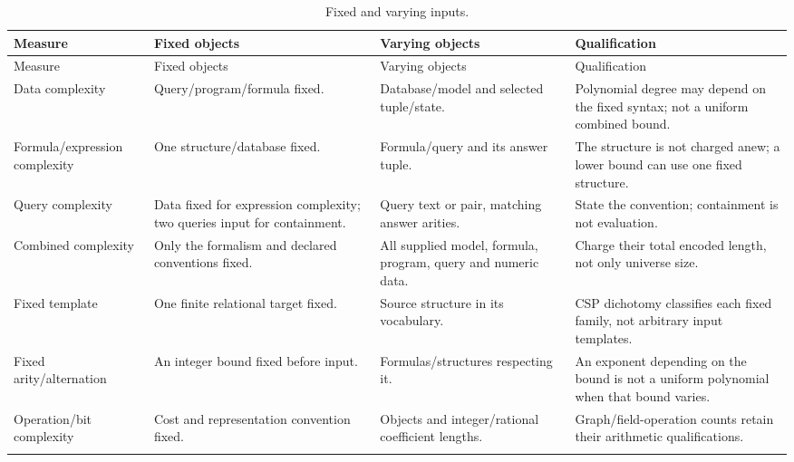 \begin{landscape}
\begingroup\small\setlength{\tabcolsep}{3pt}
\begin{longtable}{@{}p{.18\linewidth}p{.25\linewidth}p{.23\linewidth}p{.26\linewidth}@{}}
\caption{Fixed and varying inputs.}\label{tab:p14-dc-measures}\\
\toprule
Measure & Fixed objects & Varying objects & Qualification\\\midrule
\endfirsthead
\toprule
Measure & Fixed objects & Varying objects & Qualification\\\midrule
\endhead
\bottomrule\endfoot
Data complexity & Query/program/formula fixed. & Database/model and selected tuple/state. & Polynomial degree may depend on the fixed syntax; not a uniform combined bound.\\\addlinespace
Formula/expression complexity & One structure/database fixed. & Formula/query and its answer tuple. & The structure is not charged anew; a lower bound can use one fixed structure.\\\addlinespace
Query complexity & Data fixed for expression complexity; two queries input for containment. & Query text or pair, matching answer arities. & State the convention; containment is not evaluation.\\\addlinespace
Combined complexity & Only the formalism and declared conventions fixed. & All supplied model, formula, program, query and numeric data. & Charge their total encoded length, not only universe size.\\\addlinespace
Fixed template & One finite relational target fixed. & Source structure in its vocabulary. & CSP dichotomy classifies each fixed family, not arbitrary input templates.\\\addlinespace
Fixed arity/alternation & An integer bound fixed before input. & Formulas/structures respecting it. & An exponent depending on the bound is not a uniform polynomial when that bound varies.\\\addlinespace
Operation/bit complexity & Cost and representation convention fixed. & Objects and integer/rational coefficient lengths. & Graph/field-operation counts retain their arithmetic qualifications.\\\addlinespace
\end{longtable}
\endgroup
\end{landscape}


